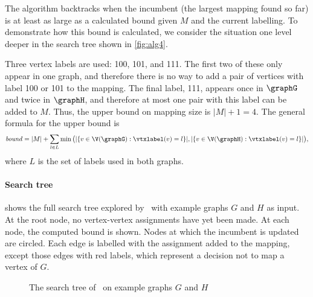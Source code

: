 The algorithm backtracks when the incumbent (the largest mapping found so far) is at least as large
as a calculated bound given $M$ and the current labelling. To demonstrate how
this bound is calculated, we consider the situation one level deeper in the
search tree shown in \cref{fig:alg4}.

Three vertex labels are used: 100,
101, and 111.  The first two of these only appear in one graph, and therefore
there is no way to add a pair of vertices with label 100 or 101 to the mapping.
The final label, 111, appears once in $\graphG$ and twice in $\graphH$, and therefore at
most one pair with this label can be added to $M$.  Thus, the upper bound on
mapping size is $|M| + 1 = 4$. The general formula for the upper bound is
\begin{multline*}
    \mathit{bound} = |M| + \sum_{l \in L} \min\big(|\{ v \in \V(\graphG) : \vtxlabel(v)=l\}|,
        |\{ v \in \V(\graphH) : \vtxlabel(v)=l \}|\big) \text{,}
\end{multline*} where $L$ is the set of labels used in both graphs.


\paragraph{Search tree}  shows the full search
tree explored by \McSplit\ with example graphs $G$ and $H$ as input.
At the root node, no vertex-vertex assignments have yet been made.  At each node,
the computed bound is shown.  Nodes at which the incumbent is updated are circled.
Each edge is labelled with the assignment added to the mapping, except those edges
with red labels, which represent a decision not to map a vertex of $G$.

\begin{figure}[h!]
    \centering
    
    \caption{The search tree of \McSplit\ on example graphs $G$ and $H$}
    \label{figure:mcsplit-search-tree}
\end{figure}


